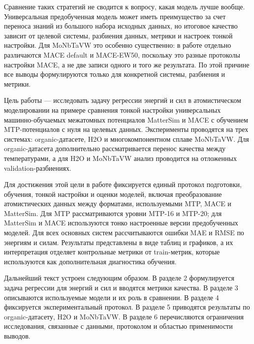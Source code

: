 Сравнение таких стратегий не сводится к вопросу, какая модель лучше вообще. Универсальная предобученная модель может иметь преимущество за счет переноса знаний из большого набора исходных данных, но итоговое качество зависит от целевой системы, разбиения данных, метрики и настроек тонкой настройки. Для MoNbTaVW это особенно существенно: в работе отдельно различаются MACE default и MACE-EW50, поскольку это разные протоколы настройки MACE, а не две записи одного и того же результата. По этой причине все выводы формулируются только для конкретной системы, разбиения и метрики.

Цель работы — исследовать задачу регрессии энергий и сил в атомистическом моделировании на примере сравнения тонкой настройки универсальных машинно-обучаемых межатомных потенциалов MatterSim и MACE с обучением MTP-потенциалов с нуля на целевых данных. Эксперименты проводятся на трех системах: organic-датасете, H2O и многокомпонентном сплаве MoNbTaVW. Для organic-датасета дополнительно рассматривается перенос качества между температурами, а для H2O и MoNbTaVW анализ проводится на отложенных validation-разбиениях.

Для достижения этой цели в работе фиксируется единый протокол подготовки, обучения, тонкой настройки и оценки моделей, включая преобразование атомистических данных между форматами, используемыми MTP, MACE и MatterSim. Для MTP рассматриваются уровни MTP-16 и MTP-20; для MatterSim и MACE используются тонко настроенные версии предобученных моделей. Для всех основных систем рассчитываются ошибки MAE и RMSE по энергиям и силам. Результаты представлены в виде таблиц и графиков, а их интерпретация отделяет контрольные метрики от train-метрик, которые используются как дополнительная диагностика обучения.

Дальнейший текст устроен следующим образом. В разделе 2 формулируется задача регрессии для энергий и сил и вводятся метрики качества. В разделе 3 описываются используемые модели и их роль в сравнении. В разделе 4 фиксируется экспериментальный протокол. В разделе 5 приводятся результаты по organic-датасету, H2O и MoNbTaVW. В разделе 6 перечисляются ограничения исследования, связанные с данными, протоколом и областью применимости выводов.
